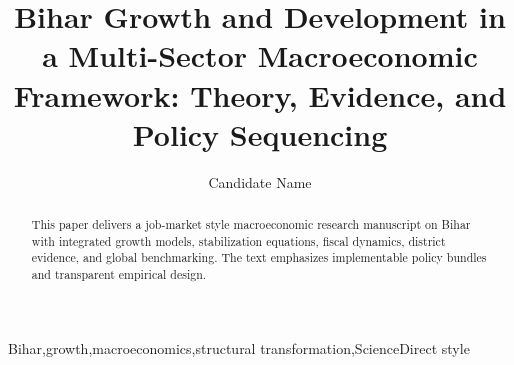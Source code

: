 \documentclass[preprint,12pt]{elsarticle}
\begin{document}
\begin{frontmatter}
\title{Bihar Growth and Development in a Multi-Sector Macroeconomic Framework: Theory, Evidence, and Policy Sequencing}
\author{Candidate Name}\address{Department of Economics, Job Market Paper}
\begin{abstract}This paper delivers a job-market style macroeconomic research manuscript on Bihar with integrated growth models, stabilization equations, fiscal dynamics, district evidence, and global benchmarking. The text emphasizes implementable policy bundles and transparent empirical design.\end{abstract}
\begin{keyword}Bihar\sep growth\sep macroeconomics\sep structural transformation\sep ScienceDirect style\end{keyword}\end{frontmatter}
\end{document}
